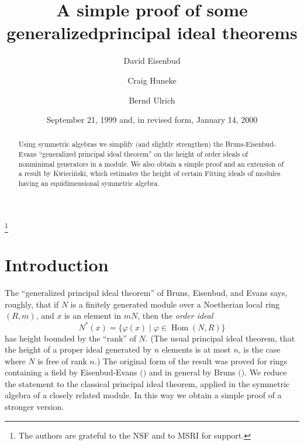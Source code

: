 \documentclass{proc-l}
\newcommand{\Hom}{\operatorname{Hom}}
\theoremstyle{remark}
\theoremstyle{definition}
\begin{document}
\title[A simple proof of some generalized principal ideal theorems]
{A simple proof of some generalized\linebreak[1]
principal ideal theorems}
\author{David Eisenbud}
\address{Mathematical Sciences Research Institute, 
1000 Centennial Drive, Berkeley, California 94720}
\author{Craig Huneke}
\address{Department of Mathematics, University of Kansas, Lawrence,
Kansas 66045}
\author{Bernd Ulrich}
\address{Department of Mathematics, Michigan State University, E.
Lansing, Michigan 48824}
\thanks{The authors are grateful to the NSF and to MSRI 
for support.}
\date{September 21, 1999 and, in revised form, January 14, 2000}

\begin{abstract}
Using symmetric algebras we simplify $($and slightly
strengthen$)$ the Bruns-Eisenbud-Evans  ``generalized principal ideal theorem''
on the height of order ideals of nonminimal generators in a module.  We also
obtain a simple proof and an  extension of a result by Kwieci\'nski, which
estimates the height of  certain Fitting ideals of modules having an
equidimensional symmetric algebra.
\end{abstract}

\maketitle

\section{Introduction}

The ``generalized principal ideal
theorem'' of Bruns, Eisenbud, and Evans says, roughly, that if
$N$ is a finitely generated 
module over a  Noetherian local ring $(R,m)$, and $x$
is an element in $mN$, then the \emph{order ideal}
\begin{equation*} N^*(x) = \{\varphi(x) \mid \varphi \in \Hom(N,R)\}
\end{equation*} 
has height bounded by the ``rank'' of $N$. (The usual principal ideal
theorem, that the height of a proper ideal generated by $n$ elements 
is at most
$n$, is the case where $N$ is free of rank $n$.)  The original form of
the result was proved for rings containing a field by Eisenbud-Evans
$($\cite{EE}$)$ and in general by Bruns $($\cite{B}$)$.  
We reduce the statement to the classical principal ideal
theorem, applied in the symmetric algebra of a closely related module.
In this way we obtain a simple proof of a stronger version.
\end{document}
